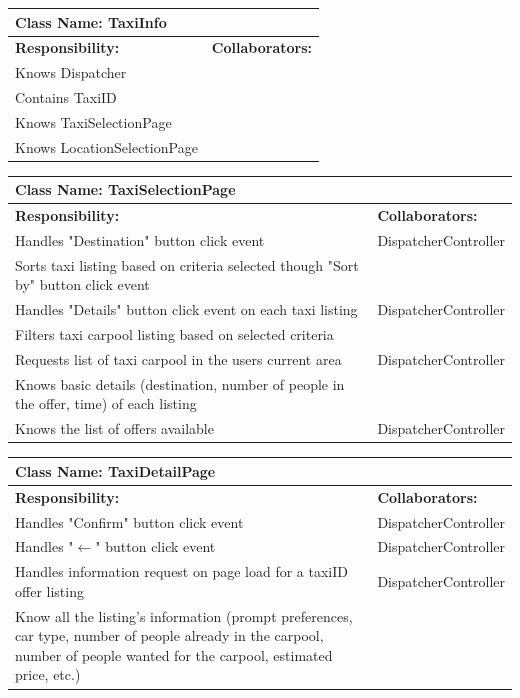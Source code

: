 \documentclass[]{article}
\begin{document}
	\begin{table}[H]
		\centering
		\begin{tabular}{|p{6cm}|p{6cm}|}
		\hline 
			\multicolumn{2}{|l|}{\textbf{Class Name: TaxiInfo}} \\
		\hline
		\textbf{Responsibility:} & \textbf{Collaborators:} \\
		\hline
		Knows Dispatcher&  \\ \hline
		Contains TaxiID&  \\ \hline
		Knows TaxiSelectionPage&  \\ \hline
		Knows LocationSelectionPage&  \\ \hline
		\end{tabular}
	\end{table}


	\begin{table}[H]
	\centering
	\begin{tabular}{|p{6cm}|p{6cm}|}
	\hline 
		\multicolumn{2}{|l|}{\textbf{Class Name: TaxiSelectionPage}} \\
	\hline
	\textbf{Responsibility:} & \textbf{Collaborators:} \\
	\hline
	Handles "Destination" button click event& DispatcherController \\ \hline
	Sorts taxi listing based on criteria selected though "Sort by" button click event  & \\ \hline
	Handles "Details" button click event on each taxi listing & DispatcherController \\ \hline
	Filters taxi carpool listing based on selected criteria & \\ \hline
	Requests list of taxi carpool in the users current area & DispatcherController \\ \hline
	Knows basic details (destination, number of people in the offer, time) of each listing & \\ \hline
    Knows the list of offers available & DispatcherController\\ \hline
	\end{tabular}
	\end{table}
	

	\begin{table}[H]
	\centering
	\begin{tabular}{|p{6cm}|p{6cm}|}
	\hline 
		\multicolumn{2}{|l|}{\textbf{Class Name: TaxiDetailPage}} \\
	\hline
	\textbf{Responsibility:} & \textbf{Collaborators:} \\
	\hline
	Handles "Confirm" button click event  & DispatcherController \\ \hline
	Handles "$\xleftarrow{}$" button click event  & DispatcherController \\ \hline
	Handles information request on page load for a taxiID offer listing & DispatcherController\\ \hline
	Know all the listing's information (prompt preferences, car type, number of people already in the carpool, number of people wanted for the carpool, estimated price, etc.)  & \\ \hline
	\end{tabular}
	\end{table}
\end{document}
